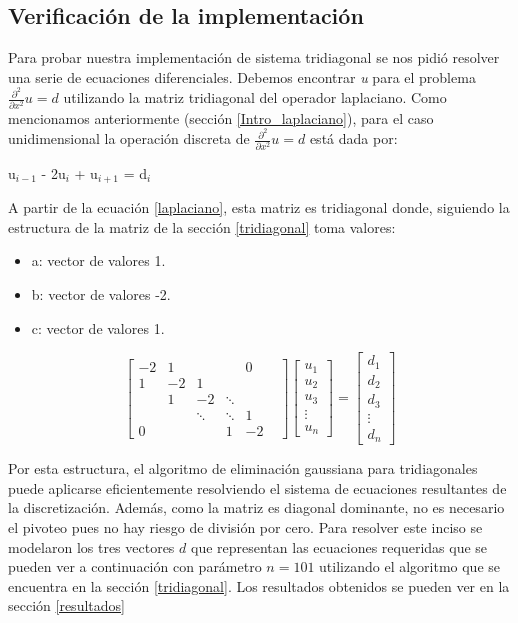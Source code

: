 \subsection{Verificación de la implementación}
Para probar nuestra implementación de sistema tridiagonal se nos pidió resolver una serie de ecuaciones diferenciales. Debemos encontrar \textit{u} para el problema $\frac{\partial^2}{\partial x^2}u = d$ utilizando la matriz tridiagonal del operador laplaciano.
Como mencionamos anteriormente (sección \ref{Intro_laplaciano}), para el caso unidimensional la operación discreta de $\frac{\partial^2}{\partial x^2}u = d$ está dada por:

u$_{i-1}$ - 2u$_{i}$ + u$_{i+1}$ = d$_{i}$

A partir de la ecuación \ref{laplaciano}, esta matriz es tridiagonal donde, siguiendo la estructura de la matriz de la sección \ref{tridiagonal} toma valores:

\begin{itemize}
    \item a: vector de valores 1.
    \item b: vector de valores -2.
    \item c: vector de valores 1.
\end{itemize}


    \[ \begin{bmatrix}
-2 & 1 & & & 0\\
1 & -2 & 1 & & & \\
    & 1 & -2 & \ddots & \\
    &    & \ddots &  \ddots & 1\\
0   &    &   & 1 & -2
     \end{bmatrix}
     \begin{bmatrix}
           u_{1}\\
           u_{2} \\
           u_{3}\\ 
           \vdots\\ 
           u_{n}  
     \end{bmatrix}
      =
     \begin{bmatrix}
          d_{1} \\
          d_{2}\\
          d_{3}\\
         \vdots\\ 
         d_{n}  
     \end{bmatrix} \]\label{laplaciano}

Por esta estructura,  el algoritmo de eliminación gaussiana para tridiagonales puede aplicarse eficientemente resolviendo el sistema de ecuaciones resultantes de la discretización. Además, como la matriz es diagonal dominante, no es necesario el pivoteo pues no hay riesgo de división por cero. 
Para resolver este inciso se modelaron los tres vectores $d$ que representan las ecuaciones requeridas que se pueden ver a continuación con parámetro $n=101$ utilizando el algoritmo que se encuentra en la sección \ref{tridiagonal}.
Los resultados obtenidos se pueden ver en la sección \ref{resultados} 

